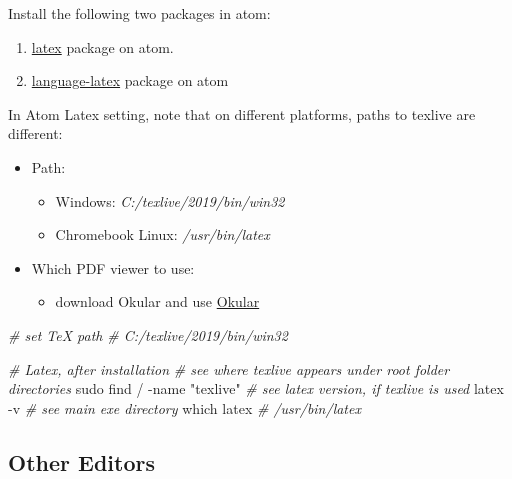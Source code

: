 \documentclass[]{article}
\newenvironment{Shaded}{\begin{snugshade}}{\end{snugshade}}
\newcommand{\CommentTok}[1]{\textcolor[rgb]{0.56,0.35,0.01}{\textit{#1}}}
\newcommand{\ExtensionTok}[1]{#1}
\newcommand{\FunctionTok}[1]{\textcolor[rgb]{0.00,0.00,0.00}{#1}}
\newcommand{\NormalTok}[1]{#1}
\newcommand{\StringTok}[1]{\textcolor[rgb]{0.31,0.60,0.02}{#1}}
\providecommand{\tightlist}{%
  \setlength{\itemsep}{0pt}\setlength{\parskip}{0pt}}
\begin{document}
Install the following two packages in atom:

\begin{enumerate}
\def\labelenumi{\arabic{enumi}.}
\tightlist
\item
  \href{https://github.com/thomasjo/atom-latex}{latex} package on atom.
\item
  \href{https://atom.io/packages/language-latex}{language-latex} package
  on atom
\end{enumerate}

In Atom Latex setting, note that on different platforms, paths to
texlive are different:

\begin{itemize}
\tightlist
\item
  Path:

  \begin{itemize}
  \tightlist
  \item
    Windows: \emph{C:/texlive/2019/bin/win32}
  \item
    Chromebook Linux: \emph{/usr/bin/latex}
  \end{itemize}
\item
  Which PDF viewer to use:

  \begin{itemize}
  \tightlist
  \item
    download Okular and use \href{https://okular.kde.org/}{Okular}
  \end{itemize}
\end{itemize}

\begin{Shaded}
\begin{Highlighting}[]
\CommentTok{# set TeX path}
\CommentTok{# C:/texlive/2019/bin/win32}

\CommentTok{# Latex, after installation}
\CommentTok{# see where texlive appears under root folder directories}
\FunctionTok{sudo}\NormalTok{ find / -name }\StringTok{"texlive"}
\CommentTok{# see latex version, if texlive is used}
\ExtensionTok{latex}\NormalTok{ -v}
\CommentTok{# see main exe directory}
\FunctionTok{which}\NormalTok{ latex}
\CommentTok{# /usr/bin/latex}
\end{Highlighting}
\end{Shaded}

\hypertarget{other-editors}{%
\subsection{Other Editors}\label{other-editors}}
\end{document}
